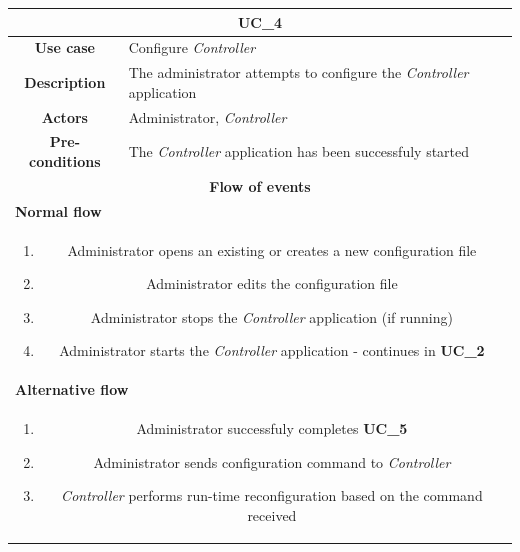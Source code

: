 \documentclass[12pt,a4paper,table]{article}
\begin{document}
            \vspace{0.5cm}
            \noindent
            \begin{longtable}{ |c|p{11.8cm}| }
                \hline
                \multicolumn{2}{|c|}{\cellcolor{lime} \textbf{UC\_4}}\\ \hline
                \cellcolor[gray]{0.9} \textbf{Use case} & Configure \textit{Controller}\\ \hline
                \cellcolor[gray]{0.9} \textbf{Description} & The administrator attempts to configure the \textit{Controller} application\\ \hline
                \cellcolor[gray]{0.9} \textbf{Actors} & Administrator, \textit{Controller}\\ \hline
                \cellcolor[gray]{0.9} \textbf{Pre-conditions} & The \textit{Controller} application has been successfuly started\\ \hline
                \multicolumn{2}{|c|}{\cellcolor[gray]{0.9} \textbf{Flow of events}}\\ \hline
                \multicolumn{2}{|l|}{\cellcolor[gray]{0.9} \textbf{Normal flow}}\\ \hline
                \multicolumn{2}{|p{14cm}|}{
                    \begin{enumerate}
                        \item Administrator opens an existing or creates a new configuration file
                        \item Administrator edits the configuration file
                        \item Administrator stops the \textit{Controller} application (if running)
                        \item Administrator starts the \textit{Controller} application - continues in \textbf{UC\_2}
                    \end{enumerate}
                }\\ \hline
                \multicolumn{2}{|l|}{\cellcolor[gray]{0.9} \textbf{Alternative flow}}\\ \hline
                \multicolumn{2}{|p{14cm}|}{
                    \begin{enumerate}
                        \item Administrator successfuly completes \textbf{UC\_5}
                        \item Administrator sends configuration command to \textit{Controller}
                        \item \textit{Controller} performs run-time reconfiguration based on the command received

\end{enumerate}}
\end{longtable}
\end{document}
